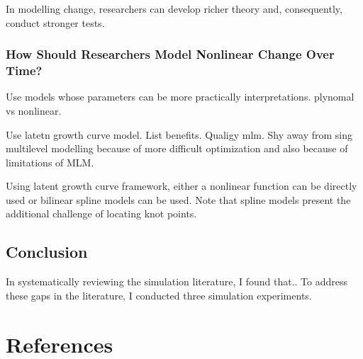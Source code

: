 \documentclass[
12pt, %
twoside,
english]{guelphthesis}
\begin{document}
In modelling change, researchers can develop richer theory and, consequently, conduct stronger tests.

\hypertarget{how-should-researchers-model-nonlinear-change-over-time}{%
\subsection{How Should Researchers Model Nonlinear Change Over Time?}\label{how-should-researchers-model-nonlinear-change-over-time}}

Use models whose parameters can be more practically interpretations. plynomal vs nonlinear.

Use latetn growth curve model. List benefits. Qualigy mlm. Shy away from sing multilevel modelling because of more difficult optimization and also because of limitations of MLM.

Using latent growth curve framework, either a nonlinear function can be directly used or bilinear spline models can be used. Note that spline models present the additional challenge of locating knot points.

\hypertarget{conclusion}{%
\section{Conclusion}\label{conclusion}}

In systematically reviewing the simulation literature, I found that.. To address these gaps in the literature, I conducted three simulation experiments.

\newpage

\hypertarget{references}{%
\chapter{References}\label{references}}

\begingroup
\end{document}
